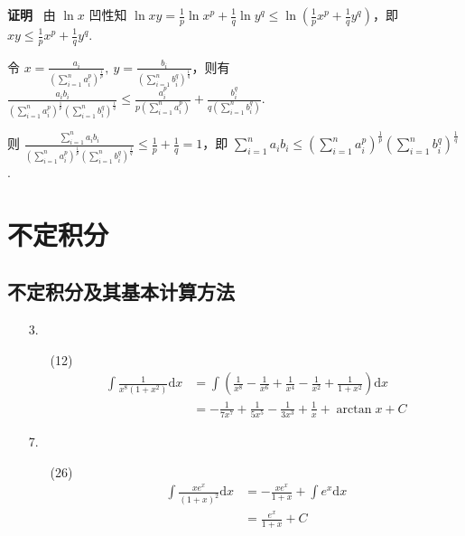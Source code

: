 \documentclass[oneside]{ctexbook} %
\begin{document}
\begin{enumerate}
    \textbf{证明} \ 由 $\ln x$ 凹性知 $\ln xy = \frac 1 p \ln x^p + \frac 1 q \ln y^q \leqslant \ln\left( \frac 1 p x^p + \frac 1 q y^q \right)$，即 $xy \leqslant \frac 1 p x^p + \frac 1 q y^q$.
    
    令 $x = \frac{a_i}{\left( \sum_{i=1}^n a_i^p \right)^{\frac 1 p}},\ y = \frac{b_i}{\left( \sum_{i=1}^n b_i^q \right)^{\frac 1 q}}$，则有 $\frac{a_ib_i}{\left( \sum_{i=1}^n a_i^p \right)^{\frac 1 p} \left( \sum_{i=1}^n b_i^q \right)^{\frac 1 q}} \leqslant \frac{a_i^p}{p \left( \sum_{i=1}^n a_i^p \right)} + \frac{b_i^q}{q \left( \sum_{i=1}^n b_i^q \right)}$.
    
    则 $\displaystyle \frac{\sum_{i=1}^n a_ib_i}{\left( \sum_{i=1}^n a_i^p \right)^{\frac 1 p} \left( \sum_{i=1}^n b_i^q \right)^{\frac 1 q}} \leqslant \frac 1 p + \frac 1 q = 1$，即 $\displaystyle \sum_{i=1}^n a_ib_i \leqslant \left( \sum_{i=1}^n a_i^p \right)^{\frac 1 p} \left( \sum_{i=1}^n b_i^q \right)^{\frac 1 q}$.
\end{enumerate}

\newpage
\chapter{不定积分}

\section{不定积分及其基本计算方法}

\begin{enumerate}
    \item[3.]
    \begin{enumerate}
        \item[(12)]
        $$
        \begin{aligned}
            \int \frac 1 {x^8(1+x^2)} \mathrm dx &= \int \left( \frac 1 {x^8} - \frac 1 {x^6} + \frac 1 {x^4} - \frac 1 {x^2} + \frac 1 {1+x^2} \right) \mathrm{d}x \\ &= - \frac 1 {7x^7} + \frac 1 {5x^5} - \frac 1 {3x^3} + \frac 1 x + \arctan x + C
        \end{aligned}
        $$
    \end{enumerate}
    \item[7.]
    \begin{enumerate}
        \item[(26)]
        $$
        \begin{aligned}
            \int \frac{xe^x}{(1+x)^2} \mathrm dx &= - \frac{xe^x}{1+x} + \int e^x \mathrm dx \\
            &= \frac{e^x}{1+x} + C
        \end{aligned}
        $$
    \end{enumerate}
\end{enumerate}
\end{document}
